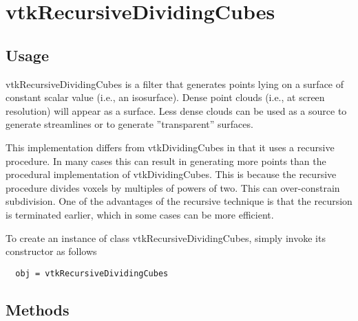 \section{vtkRecursiveDividingCubes}

\subsection{Usage}

 vtkRecursiveDividingCubes is a filter that generates points lying on a 
 surface of constant scalar value (i.e., an isosurface). Dense point 
 clouds (i.e., at screen resolution) will appear as a surface. Less dense 
 clouds can be used as a source to generate streamlines or to generate 
 ''transparent'' surfaces.

 This implementation differs from vtkDividingCubes in that it uses a 
 recursive procedure. In many cases this can result in generating 
 more points than the procedural implementation of vtkDividingCubes. This is
 because the recursive procedure divides voxels by multiples of powers of 
 two. This can over-constrain subdivision. One of the advantages of the 
 recursive technique is that the recursion is terminated earlier, which in
 some cases can be more efficient.

To create an instance of class vtkRecursiveDividingCubes, simply
invoke its constructor as follows
\begin{verbatim}
  obj = vtkRecursiveDividingCubes
\end{verbatim}
\subsection{Methods}

